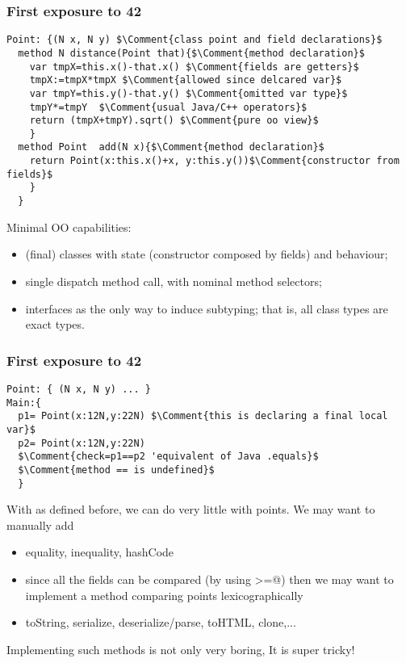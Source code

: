 
\begin{frame}[fragile]
\frametitle{First exposure to 42}
\begin{NiceCode}{59ex}{0.8}
\begin{lstlisting}
Point: {(N x, N y) $\Comment{class point and field declarations}$
  method N distance(Point that){$\Comment{method declaration}$
    var tmpX=this.x()-that.x() $\Comment{fields are getters}$
    tmpX:=tmpX*tmpX $\Comment{allowed since delcared var}$
    var tmpY=this.y()-that.y() $\Comment{omitted var type}$
    tmpY*=tmpY  $\Comment{usual Java/C++ operators}$
    return (tmpX+tmpY).sqrt() $\Comment{pure oo view}$
    }
  method Point  add(N x){$\Comment{method declaration}$
    return Point(x:this.x()+x, y:this.y())$\Comment{constructor from fields}$
    }
  }
\end{lstlisting}
\end{NiceCode}

Minimal OO capabilities:
\begin{itemize}
\item (final) classes with state (constructor composed by fields) and behaviour;
\item single dispatch method call, with nominal method selectors;
\item interfaces as the only way to induce subtyping; that is, all class types are exact types.
\end{itemize}

\end{frame}

\begin{frame}[fragile]
\frametitle{First exposure to 42}
\begin{NiceCode}{59ex}{0.8}
\begin{lstlisting}
Point: { (N x, N y) ... }
Main:{
  p1= Point(x:12N,y:22N) $\Comment{this is declaring a final local var}$
  p2= Point(x:12N,y:22N)
  $\Comment{check=p1==p2 'equivalent of Java .equals}$
  $\Comment{method == is undefined}$
  }
\end{lstlisting}
\end{NiceCode}

With \Q@Point@ as defined before, we can do very little with points.
We may want to manually add
\begin{itemize}
\item equality, inequality, hashCode
\item since all the fields can be compared  (by using \Q@>=@) then
we may want to implement a method comparing points lexicographically
\item toString, serialize, deserialize/parse, toHTML, clone,...
\end{itemize}
Implementing such methods is not only very boring,
\pause\alert{It is super tricky!}

\end{frame}

